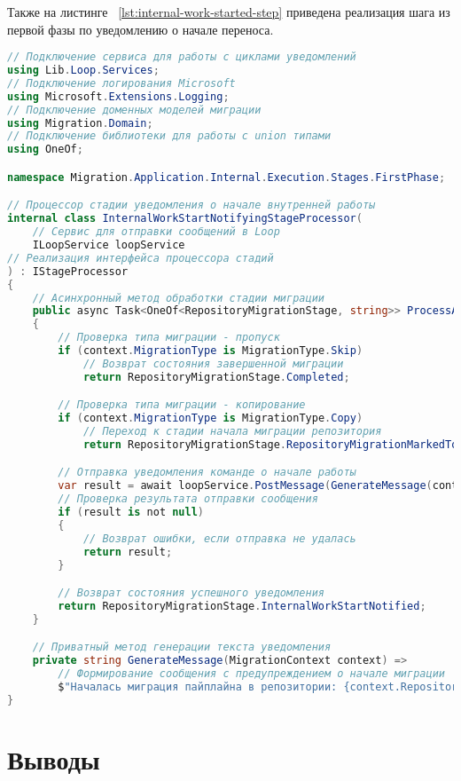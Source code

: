 Также на листинге ~\ref{lst:internal-work-started-step} приведена реализация шага из первой фазы по уведомлению о начале переноса.

\begin{lstlisting}[language=c#,label={lst:internal-work-started-step},caption={Код шага оповещения о старте начала работ}]
// Подключение сервиса для работы с циклами уведомлений
using Lib.Loop.Services;
// Подключение логирования Microsoft
using Microsoft.Extensions.Logging;
// Подключение доменных моделей миграции
using Migration.Domain;
// Подключение библиотеки для работы с union типами
using OneOf;

namespace Migration.Application.Internal.Execution.Stages.FirstPhase;

// Процессор стадии уведомления о начале внутренней работы
internal class InternalWorkStartNotifyingStageProcessor(
    // Сервис для отправки сообщений в Loop
    ILoopService loopService
// Реализация интерфейса процессора стадий
) : IStageProcessor
{
    // Асинхронный метод обработки стадии миграции
    public async Task<OneOf<RepositoryMigrationStage, string>> ProcessAsync(MigrationContext context, ILogger logger)
    {
        // Проверка типа миграции - пропуск
        if (context.MigrationType is MigrationType.Skip)
            // Возврат состояния завершенной миграции
            return RepositoryMigrationStage.Completed;

        // Проверка типа миграции - копирование
        if (context.MigrationType is MigrationType.Copy)
            // Переход к стадии начала миграции репозитория
            return RepositoryMigrationStage.RepositoryMigrationMarkedToStart;

        // Отправка уведомления команде о начале работы
        var result = await loopService.PostMessage(GenerateMessage(context), context.Team);
        // Проверка результата отправки сообщения
        if (result is not null)
        {
            // Возврат ошибки, если отправка не удалась
            return result;
        }

        // Возврат состояния успешного уведомления
        return RepositoryMigrationStage.InternalWorkStartNotified;
    }

    // Приватный метод генерации текста уведомления
    private string GenerateMessage(MigrationContext context) =>
        // Формирование сообщения с предупреждением о начале миграции
        $"Началась миграция пайплайна в репозитории: {context.RepositoryName}. ** Пожалуйста, не меняйте его Workflow ** ";
}
\end{lstlisting}

\section{Выводы} \label{sec:conclusion}

